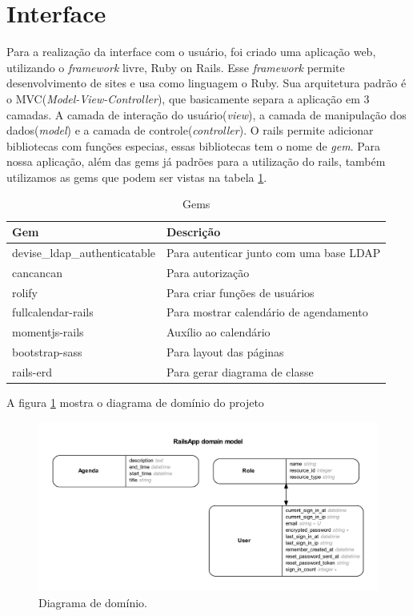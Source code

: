 \section{Interface} %
\label{sub:interface}
  Para a realização da interface com o usuário, foi criado uma aplicação web, utilizando o \textit{framework} livre, Ruby on Rails\cite{rails}.
Esse \textit{framework} permite desenvolvimento de sites e usa como linguagem o Ruby. Sua arquitetura padrão é o MVC(\textit{Model-View-Controller}),
 que basicamente separa a aplicação em 3 camadas. A camada de interação do usuário(\textit{view}), a camada de manipulação dos dados(\textit{model}) 
e a camada de controle(\textit{controller})\cite{mvc}.
  O rails permite adicionar bibliotecas com funções especias, essas bibliotecas tem o nome de \textit{gem}. Para nossa aplicação, além das gems já padrões para a utilização
  do rails, também utilizamos as gems que podem ser vistas na tabela \ref{gems}.
\begin{table}[H]
\centering
\caption{Gems}
\label{gems}
\begin{tabular}{|l|l|}
\hline
\rowcolor[HTML]{C0C0C0} 
{\color[HTML]{333333} \textbf{Gem}} & {\color[HTML]{333333} \textbf{Descrição}} \\ \hline
devise\_ldap\_authenticatable       & Para autenticar junto com uma base LDAP   \\ \hline
cancancan                           & Para autorização                          \\ \hline
rolify                              & Para criar funções de usuários            \\ \hline
fullcalendar-rails                  & Para mostrar calendário de agendamento    \\ \hline
momentjs-rails                      & Auxílio ao calendário                     \\ \hline
bootstrap-sass                      & Para layout das páginas                   \\ \hline
rails-erd                           & Para gerar diagrama de classe             \\ \hline
\end{tabular}
\end{table}

A figura \ref{img:diagrama} mostra o diagrama de domínio do projeto

\begin{figure}[H]
	\centering
	\includegraphics[scale=0.7]{figuras/erd.pdf}
	\caption{Diagrama de domínio.}
	\label{img:diagrama}
\end{figure}

